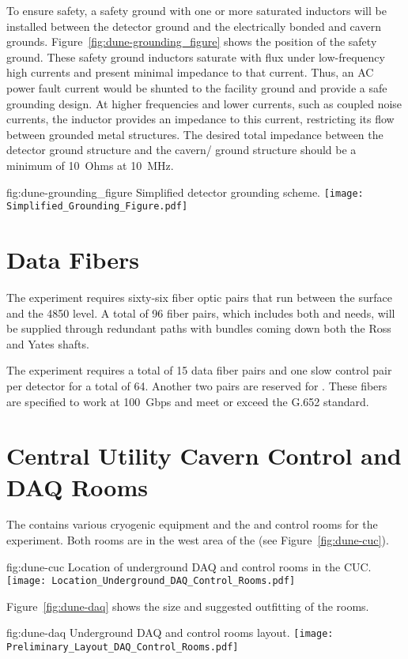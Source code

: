 To ensure safety, a safety ground with one or more saturated inductors
will be installed between the detector ground and the electrically
bonded  and cavern grounds.
Figure~\ref{fig:dune-grounding_figure} shows the position of the
safety ground. These safety ground inductors saturate with flux under
low-frequency high currents and present minimal impedance to that
current.  Thus, an AC power fault current would be shunted to the
facility ground and provide a safe grounding design. At higher
frequencies and lower currents, such as coupled noise currents, the
inductor provides an impedance to this current, restricting its flow
between grounded metal structures. The desired total impedance between
the detector ground structure and the cavern/ ground
structure should be a minimum of \SI{10}{Ohms} at \SI{10}{MHz}.
\begin{dunefigure}{fig:dune-grounding_figure}
  {Simplified detector grounding scheme.}
  \texttt{[image: Simplified\_Grounding\_Figure.pdf]}
\end{dunefigure}


\section{Data Fibers}
\label{sec:fdsp-coord-faci-fibers}


The  experiment requires sixty-six fiber
optic pairs that run between the surface and the 4850 level.  A
total of 96 fiber pairs, which includes both  and 
needs, will be supplied through redundant paths with bundles
coming down both the Ross and Yates shafts.


The experiment requires a total of 15 data fiber pairs and one slow
control pair per detector for a total of 64.  Another two pairs are
reserved for . These fibers are specified to work at
100~Gbps and meet or exceed the G.652 standard.


\section{Central Utility Cavern Control and DAQ Rooms}
\label{sec:fdsp-coord-cuc-daq}


The  contains various cryogenic equipment and the  and control
rooms for the  experiment.  Both rooms are in the west
area of the  (see Figure~\ref{fig:dune-cuc}).  
\begin{dunefigure}{fig:dune-cuc}
  {Location of underground DAQ and control rooms in the CUC.}
  \texttt{[image: Location\_Underground\_DAQ\_Control\_Rooms.pdf]}
\end{dunefigure}
Figure~\ref{fig:dune-daq} shows the size and suggested outfitting of the rooms.
\begin{dunefigure}{fig:dune-daq}
  {Underground DAQ and control rooms layout.}
  \texttt{[image: Preliminary\_Layout\_DAQ\_Control\_Rooms.pdf]}
\end{dunefigure}


